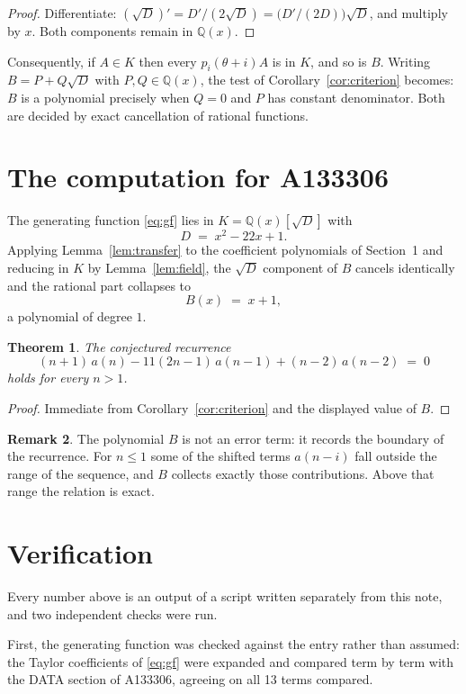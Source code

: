 \documentclass[11pt,a4paper]{article}
\theoremstyle{plain}
\newtheorem{theorem}{Theorem}
\theoremstyle{definition}
\newtheorem{remark}[theorem]{Remark}
\begin{document}
\begin{proof}
Differentiate: $(\sqrt{D})'=D'/(2\sqrt{D})=\bigl(D'/(2D)\bigr)\sqrt{D}$, and multiply by
$x$. Both components remain in $\mathbb{Q}(x)$.
\end{proof}

Consequently, if $A\in K$ then every $p_{i}(\theta+i)A$ is in $K$, and so is $B$. Writing
$B=P+Q\sqrt{D}$ with $P,Q\in\mathbb{Q}(x)$, the test of Corollary~\ref{cor:criterion}
becomes: $B$ is a polynomial precisely when $Q=0$ and $P$ has constant denominator. Both
are decided by exact cancellation of rational functions.

\section{The computation for A133306}

The generating function \eqref{eq:gf} lies in $K=\mathbb{Q}(x)[\sqrt{D}]$ with
\[
D \;=\; x^{2} - 22 x + 1 .
\]
Applying Lemma~\ref{lem:transfer} to the coefficient polynomials of Section~1 and reducing
in $K$ by Lemma~\ref{lem:field}, the $\sqrt{D}$ component of $B$ cancels identically and
the rational part collapses to
\[
B(x)\;=\;x + 1 ,
\]
a polynomial of degree $1$.

\begin{theorem}
The conjectured recurrence
\[
(n + 1)\,a(n) -  11 \left(2 n - 1\right)\,a(n-1) + (n - 2)\,a(n-2) \;=\;0
\]
holds for every $n>1$.
\end{theorem}

\begin{proof}
Immediate from Corollary~\ref{cor:criterion} and the displayed value of $B$.
\end{proof}

\begin{remark}
The polynomial $B$ is not an error term: it records the boundary of the recurrence. For
$n\le1$ some of the shifted terms $a(n-i)$ fall outside the range of the sequence,
and $B$ collects exactly those contributions. Above that range the relation is exact.
\end{remark}

\section{Verification}

Every number above is an output of a script written separately from this note, and two
independent checks were run.

First, the generating function was checked against the entry rather than assumed: the
Taylor coefficients of \eqref{eq:gf} were expanded and compared term by term with the DATA
section of A133306, agreeing on all 13 terms compared.
\end{document}

